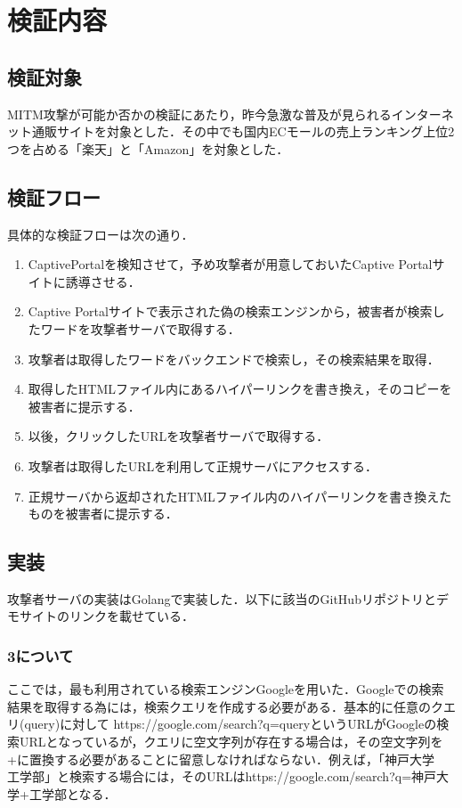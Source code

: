 \documentclass[dvipdfmx]{jsarticle}
\begin{document}
    \section{検証内容}
    \subsection{検証対象}
    MITM攻撃が可能か否かの検証にあたり，昨今急激な普及が見られるインターネット通販サイトを対象とした．その中でも国内ECモールの売上ランキング上位2つを占める「楽天」と「Amazon」を対象とした．
    \subsection{検証フロー}
    具体的な検証フローは次の通り．
    \begin{enumerate}
        \item CaptivePortalを検知させて，予め攻撃者が用意しておいたCaptive Portalサイトに誘導させる．
        \item Captive Portalサイトで表示された偽の検索エンジンから，被害者が検索したワードを攻撃者サーバで取得する．
        \item 攻撃者は取得したワードをバックエンドで検索し，その検索結果を取得．
        \item 取得したHTMLファイル内にあるハイパーリンクを書き換え，そのコピーを被害者に提示する．
        \item 以後，クリックしたURLを攻撃者サーバで取得する．
        \item 攻撃者は取得したURLを利用して正規サーバにアクセスする．
        \item 正規サーバから返却されたHTMLファイル内のハイパーリンクを書き換えたものを被害者に提示する．
    \end{enumerate}
    \subsection{実装}
    攻撃者サーバの実装はGolangで実装した．以下に該当のGitHubリポジトリとデモサイトのリンクを載せている．
    \subsubsection{3について}
    ここでは，最も利用されている検索エンジンGoogleを用いた．Googleでの検索結果を取得する為には，検索クエリを作成する必要がある．基本的に任意のクエリ(query)に対して https://google.com/search?q=queryというURLがGoogleの検索URLとなっているが，クエリに空文字列が存在する場合は，その空文字列を+に置換する必要があることに留意しなければならない．例えば，「神戸大学　工学部」と検索する場合には，そのURLはhttps://google.com/search?q=神戸大学+工学部となる．
\end{document}
